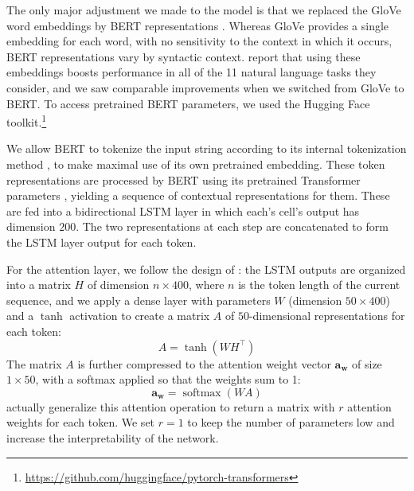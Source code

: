 \documentclass[11pt,a4paper]{article}
\DeclareMathOperator{\softmax}{softmax}
\begin{document}


The only major adjustment we made to the model is that we replaced the GloVe word embeddings \citep{Pennington:2014} by BERT representations \citep{Devlin:2018}. Whereas GloVe provides a single embedding for each word, with no sensitivity to the context in which it occurs, BERT representations vary by syntactic context. \citeauthor{Devlin:2018} report that using these embeddings boosts performance in all of the 11 natural language tasks they consider, and we saw comparable improvements when we switched from GloVe to BERT. To access pretrained BERT parameters, we used the Hugging Face toolkit.\footnote{\url{https://github.com/huggingface/pytorch-transformers}}

We allow BERT to tokenize the input string according to its internal tokenization method \citep{wu2016google}, to make maximal use of its own pretrained embedding. These token representations are processed by BERT using its pretrained Transformer parameters \citep{Vaswani:2017}, yielding a sequence of contextual representations for them. These are fed into a bidirectional LSTM layer in which each's cell's output has dimension $200$. The two representations at each step are concatenated to form the LSTM layer output for each token.

For the attention layer, we follow the design of \citeauthor{Lin:2017}: the LSTM outputs are organized into a matrix $H$ of dimension $n \times 400$, where $n$ is the token length of the current sequence, and we apply a dense layer with parameters $W$ (dimension $50 \times 400$) and a $\tanh$ activation to create a matrix $A$ of $50$-dimensional representations for each token:
\begin{equation}
  A = \tanh(WH^{\top}) \label{eq:A}
\end{equation}
%
The matrix $A$ is further compressed to the attention weight vector $\mathbf{a_w}$ of size $1 \times 50$, with a softmax applied so that the weights sum to 1:
%
\begin{equation}
  \mathbf{a_w} = \softmax(WA) \label{eq:attn}
\end{equation}
%
\citeauthor{Lin:2017} actually generalize this attention operation to return a matrix with $r$ attention weights for each token. We set $r=1$ to keep the number of parameters low and increase the interpretability of the network.
\end{document}
